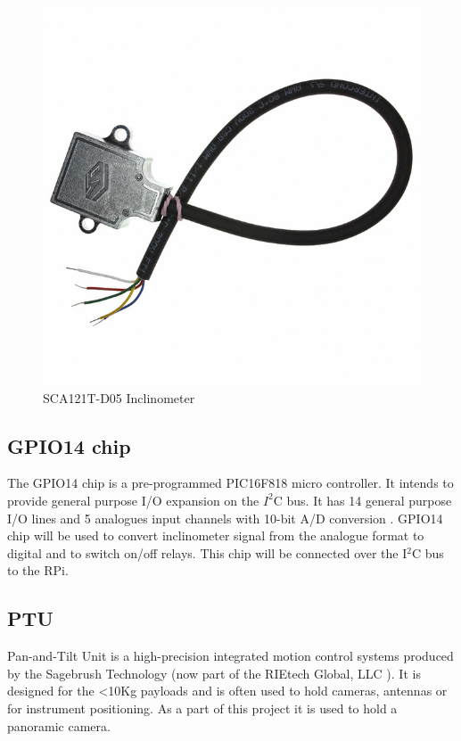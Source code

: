 \begin{figure}[H]
\centering
\centerline{\includegraphics[scale=0.20]{./images/SCA121T}}
\caption{SCA121T-D05 Inclinometer}
\label{fig:SCA121T-D05_inclinometer}
\end{figure}

\subsection{GPIO14 chip}
The GPIO14 chip is a pre-programmed PIC16F818 micro controller. It intends to provide general purpose I/O expansion on the $I^2$C bus. It has 14 general purpose I/O lines and 5 analogues input channels with 10-bit A/D conversion \cite{GPIO14}. GPIO14 chip will be used to convert inclinometer signal from the analogue format to digital and to switch on/off relays. This chip will be connected over the I$^2$C bus to the RPi.

\subsection{PTU}
Pan-and-Tilt Unit is a high-precision integrated motion control systems produced by the Sagebrush Technology (now part of the RIEtech Global, LLC \cite{RIEtech_Global}). It is designed for the <10Kg payloads and is often used to hold cameras, antennas or for instrument positioning. As a part of this project it is used to hold a panoramic camera. 

